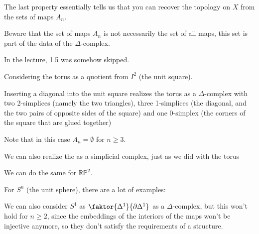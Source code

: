 \begin{oral}
    The last property essentially tells us that you can recover the topology on $X$ from the sets of maps $A_n$.

    Beware that the set of maps $A_n$ is not necessarily the set of all maps, this set is part of the data of the $\Delta$-complex.
\end{oral}

\begin{placeholder}
    In the lecture, 1.5 was somehow skipped.
\end{placeholder}

\begin{example}\label{ex:delta-complex-torus}
    Considering the torus as a quotient from $I^2$ (the unit square).


    Inserting a diagonal into the unit square realizes the torus as a $\Delta$-complex with two 2-simplices (namely the two triangles), three 1-simplices (the diagonal, and the two pairs of opposite sides of the square) and one 0-simplex (the corners of the square that are glued together)

    Note that in this case $A_n = \emptyset$ for $n\geq 3$.
\end{example}

\begin{example*}\label{ex:klein-bottle-delta-complex}
    We can also realize the  as a simplicial complex, just as we did with the torus
\end{example*}

\begin{example*}\label{ex:delta-complex-projective-space}
    We can do the same for $\mathbb{R}\mathbb{P}^2$.
\end{example*}

\begin{example*}\label{ex:delta-complex-sphere}
    For $S^n$ (the unit sphere), there are a lot of examples:

   
    We can also consider $S^1$ as  $\faktor{\Delta^1}{\partial\Delta^1}$ as a $\Delta$-complex, but this won't hold for $n\geq 2$, since the embeddings of the interiors of the maps won't be injective anymore, so they don't satisfy the requirements of a structure.
\end{example*}

